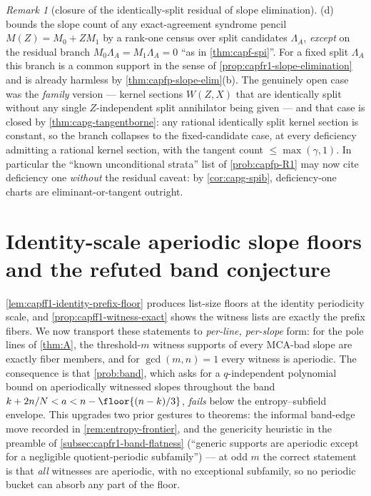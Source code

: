 \documentclass[11pt]{article}
\theoremstyle{definition}
\theoremstyle{remark}
\newtheorem{remark}[remark]{Remark}
\begin{document}
\begin{remark}[closure of the identically-split residual of slope
elimination]\label{rem:capg-slopeelim-closure}
\textup{(d)} bounds the slope count of any
exact-agreement syndrome pencil $M(Z)=M_0+ZM_1$ by a rank-one census over
split candidates $\Lambda_A$, \emph{except} on the residual branch
$M_0\Lambda_A=M_1\Lambda_A=0$ ``as in \cref{thm:capf-spi}''.  For a fixed
split $\Lambda_A$ this branch is a common support in the sense of
\cref{prop:capfr1-slope-elimination} and is already harmless by
\cref{thm:capfp-slope-elim}\textup{(b)}.  The genuinely open case was the
\emph{family} version --- kernel sections $W(Z,X)$ that are identically
split without any single $Z$-independent split annihilator being given
--- and that case is closed by \cref{thm:capg-tangentborne}: any rational
identically split kernel section is constant, so the branch collapses to
the fixed-candidate case, at every deficiency admitting a rational kernel
section, with the tangent count $\le\max(\gamma,1)$.  In particular the
``known unconditional strata'' list of \cref{prob:capfp-R1} may now cite
deficiency one \emph{without} the residual caveat: by
\cref{cor:capg-spib}, deficiency-one charts are eliminant-or-tangent
outright.
\end{remark}

\section{Identity-scale aperiodic slope floors and the refuted band
conjecture}\label{sec:capg-floors}

\cref{lem:capff1-identity-prefix-floor} produces list-size floors at the
identity periodicity scale, and \cref{prop:capff1-witness-exact} shows the
witness lists are exactly the prefix fibers.  We now transport these
statements to \emph{per-line, per-slope} form: for the pole lines of
\cref{thm:A}, the threshold-$m$ witness supports of every MCA-bad slope
are exactly fiber members, and for $\gcd(m,n)=1$ every witness is
aperiodic.  The consequence is that \cref{prob:band}, which asks for a
$q$-independent polynomial bound on aperiodically witnessed slopes
throughout the band $k+2n/N<a<n-\floor{(n-k)/3}$, \emph{fails} below the
entropy--subfield envelope.  This upgrades two prior gestures to
theorems: the informal band-edge move recorded in
\cref{rem:entropy-frontier}, and the genericity heuristic in the preamble
of \cref{subsec:capfr1-band-flatness} (``generic supports are aperiodic
except for a negligible quotient-periodic subfamily'') --- at odd $m$ the
correct statement is that \emph{all} witnesses are aperiodic, with no
exceptional subfamily, so no periodic bucket can absorb any part of the
floor.
\end{document}
